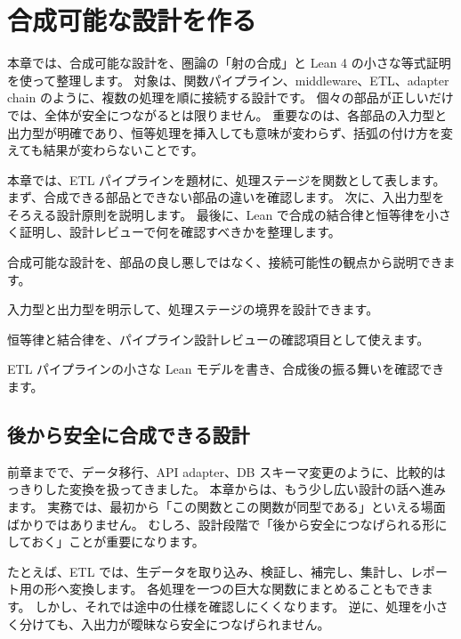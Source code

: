 \chapter{合成可能な設計を作る}
\label{chap:composable-design}

\begin{chapterabstract}
本章では、合成可能な設計を、圏論の「射の合成」と Lean 4 の小さな等式証明を使って整理します。
対象は、関数パイプライン、middleware、ETL、adapter chain のように、複数の処理を順に接続する設計です。
個々の部品が正しいだけでは、全体が安全につながるとは限りません。
重要なのは、各部品の入力型と出力型が明確であり、恒等処理を挿入しても意味が変わらず、括弧の付け方を変えても結果が変わらないことです。

本章では、ETL パイプラインを題材に、処理ステージを関数として表します。
まず、合成できる部品とできない部品の違いを確認します。
次に、入出力型をそろえる設計原則を説明します。
最後に、Lean で合成の結合律と恒等律を小さく証明し、設計レビューで何を確認すべきかを整理します。
\end{chapterabstract}

\begin{learninggoals}
\item 合成可能な設計を、部品の良し悪しではなく、接続可能性の観点から説明できます。
\item 入力型と出力型を明示して、処理ステージの境界を設計できます。
\item 恒等律と結合律を、パイプライン設計レビューの確認項目として使えます。
\item ETL パイプラインの小さな Lean モデルを書き、合成後の振る舞いを確認できます。
\end{learninggoals}

\section{後から安全に合成できる設計}

前章までで、データ移行、API adapter、DB スキーマ変更のように、比較的はっきりした変換を扱ってきました。
本章からは、もう少し広い設計の話へ進みます。
実務では、最初から「この関数とこの関数が同型である」といえる場面ばかりではありません。
むしろ、設計段階で「後から安全につなげられる形にしておく」ことが重要になります。

たとえば、ETL では、生データを取り込み、検証し、補完し、集計し、レポート用の形へ変換します。
各処理を一つの巨大な関数にまとめることもできます。
しかし、それでは途中の仕様を確認しにくくなります。
逆に、処理を小さく分けても、入出力が曖昧なら安全につなげられません。

